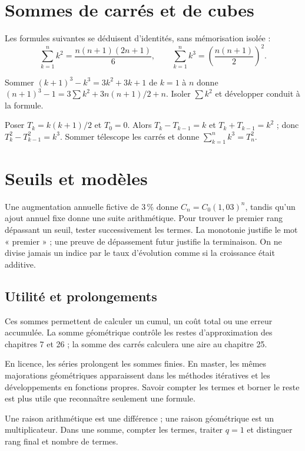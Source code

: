 \documentclass[../cours_1re.tex]{subfiles}
\begin{document}
\section{Sommes de carrés et de cubes}
\approfondissement Les formules suivantes se déduisent d'identités, sans mémorisation isolée :
\[
\sum_{k=1}^n k^2=\frac{n(n+1)(2n+1)}6,\qquad
\sum_{k=1}^n k^3=\left(\frac{n(n+1)}2\right)^2.
\]
\begin{demonstration}[Carrés]
Sommer $(k+1)^3-k^3=3k^2+3k+1$ de $k=1$ à $n$ donne
$(n+1)^3-1=3\sum k^2+3n(n+1)/2+n$. Isoler $\sum k^2$ et développer conduit à la formule.
\end{demonstration}
\begin{demonstration}[Cubes]
Poser $T_k=k(k+1)/2$ et $T_0=0$. Alors
$T_k-T_{k-1}=k$ et $T_k+T_{k-1}=k^2$ ; donc
$T_k^2-T_{k-1}^2=k^3$. Sommer télescope les carrés et donne $\sum_{k=1}^n k^3=T_n^2$.
\end{demonstration}
\section{Seuils et modèles}
Une augmentation annuelle fictive de $3\,\%$ donne $C_n=C_0(1{,}03)^n$, tandis qu'un ajout annuel fixe donne une suite arithmétique.
Pour trouver le premier rang dépassant un seuil, tester successivement les termes. La monotonie justifie le mot « premier » ; une preuve de dépassement futur justifie la terminaison. On ne divise jamais un indice par le taux d'évolution comme si la croissance était additive.

\begin{finchapitre}
\section{Utilité et prolongements}
Ces sommes permettent de calculer un cumul, un coût total ou une erreur accumulée. La somme géométrique contrôle les restes d'approximation des chapitres 7 et 26 ; la somme des carrés calculera une aire au chapitre 25.

En licence, les séries prolongent les sommes finies. En master, les mêmes majorations géométriques apparaissent dans les méthodes itératives et les développements en fonctions propres. Savoir compter les termes et borner le reste est plus utile que reconnaître seulement une formule.
\begin{retenir}
Une raison arithmétique est une différence ; une raison géométrique est un multiplicateur. Dans une somme, compter les termes, traiter $q=1$ et distinguer rang final et nombre de termes.
\end{retenir}
\end{finchapitre}
\end{document}

